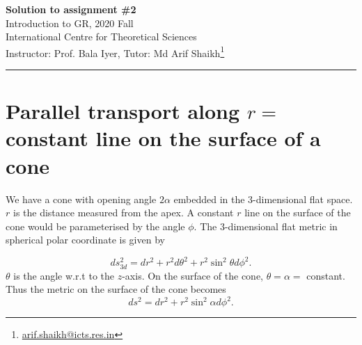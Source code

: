 \documentclass[fleqn]{article}
\begin{document}
\begin{center}
  {\bfseries Solution to assignment \#2}\\
  Introduction to GR, 2020 Fall\\
  International Centre for Theoretical Sciences\\
  Instructor: Prof. Bala Iyer, Tutor: Md Arif Shaikh\footnote{\href{mailto: arif.shaikh@icts.res.in}{arif.shaikh@icts.res.in}}\\
\end{center}
\hrule


\section{Parallel transport along $r=$ constant line on the surface of a cone}

\begin{center}
\end{center}

We have a cone with opening angle $2\alpha$ embedded in the 3-dimensional flat space. $r$ is the distance measured from the apex. A constant $r$ line on the surface of the cone would be parameterised by the angle $\phi$. The 3-dimensional flat metric in spherical polar coordinate is given by

\begin{equation}
  \label{eq:3-d-flat-metric}
  ds^2_{3d} = dr^2 + r^2d\theta^2 + r^2\sin^2\theta d\phi^2.
\end{equation}
$\theta$ is the angle w.r.t to the $z$-axis. On the surface of the cone, $\theta=\alpha=$ constant. Thus the metric on the surface of the cone becomes
\begin{equation}
  \label{eq:2-d-metric-on-cone}
  \boxed{ds^2 = dr^2 + r^2\sin^2\alpha d\phi^2.}
\end{equation}
\end{document}
